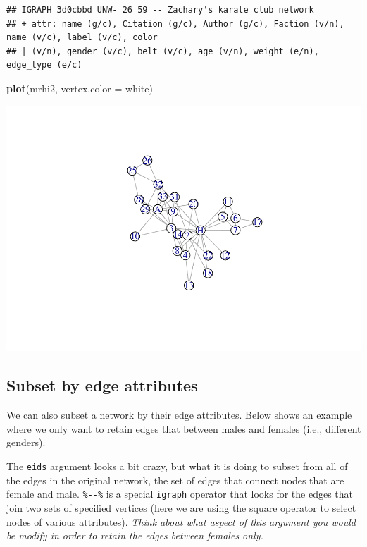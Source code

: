 \documentclass[
]{book}
\newenvironment{Shaded}{\begin{snugshade}}{\end{snugshade}}
\newcommand{\AttributeTok}[1]{\textcolor[rgb]{0.13,0.29,0.53}{#1}}
\newcommand{\FunctionTok}[1]{\textcolor[rgb]{0.13,0.29,0.53}{\textbf{#1}}}
\newcommand{\NormalTok}[1]{#1}
\newcommand{\StringTok}[1]{\textcolor[rgb]{0.31,0.60,0.02}{#1}}
\begin{document}
\begin{verbatim}
## IGRAPH 3d0cbbd UNW- 26 59 -- Zachary's karate club network
## + attr: name (g/c), Citation (g/c), Author (g/c), Faction (v/n), name (v/c), label (v/c), color
## | (v/n), gender (v/c), belt (v/c), age (v/n), weight (e/n), edge_type (e/c)
\end{verbatim}

\begin{Shaded}
\begin{Highlighting}[]
\FunctionTok{plot}\NormalTok{(mrhi2, }\AttributeTok{vertex.color =} \StringTok{\textquotesingle{}white\textquotesingle{}}\NormalTok{)}
\end{Highlighting}
\end{Shaded}

\includegraphics{bookdown-demo_files/figure-latex/unnamed-chunk-48-1.pdf}

\subsection{Subset by edge attributes}\label{subset-by-edge-attributes}

We can also subset a network by their edge attributes. Below shows an example where we only want to retain edges that between males and females (i.e., different genders).

The \texttt{eids} argument looks a bit crazy, but what it is doing to subset from all of the edges in the original network, the set of edges that connect nodes that are female and male. \texttt{\%-\/-\%} is a special \texttt{igraph} operator that looks for the edges that join two sets of specified vertices (here we are using the square operator to select nodes of various attributes). \emph{Think about what aspect of this argument you would be modify in order to retain the edges between females only.}
\end{document}
